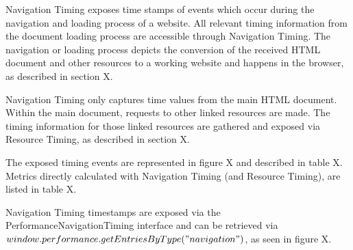 



Navigation Timing exposes time stamps of events which occur during the navigation and loading process of a website.
All relevant timing information from the document loading process are accessible through Navigation Timing.
The navigation or loading process depicts the conversion of the received HTML document and other resources to a working website and happens in the browser, as described in section X. %

Navigation Timing only captures time values from the main HTML document.
Within the main document, requests to other linked resources are made.
The timing information for those linked resources are gathered and exposed via Resource Timing, as described in section X. %

The exposed timing events are represented in figure X and described in table X.
Metrics directly calculated with Navigation Timing (and Resource Timing), are listed in table X.



Navigation Timing timestamps are exposed via the PerformanceNavigationTiming interface and can be retrieved via $window.performance.getEntriesByType("navigation")$, as seen in figure X. %







